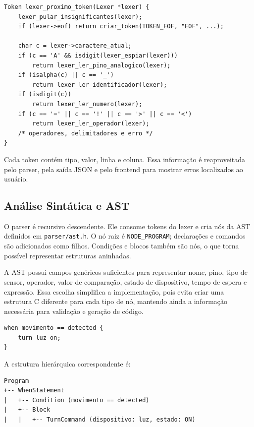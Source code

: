 \documentclass[conference]{IEEEtran}
\begin{document}
\begin{lstlisting}[style=csmall,caption={Fluxo simplificado do lexer.},label={lst:lexer}]
Token lexer_proximo_token(Lexer *lexer) {
    lexer_pular_insignificantes(lexer);
    if (lexer->eof) return criar_token(TOKEN_EOF, "EOF", ...);

    char c = lexer->caractere_atual;
    if (c == 'A' && isdigit(lexer_espiar(lexer)))
        return lexer_ler_pino_analogico(lexer);
    if (isalpha(c) || c == '_')
        return lexer_ler_identificador(lexer);
    if (isdigit(c))
        return lexer_ler_numero(lexer);
    if (c == '=' || c == '!' || c == '>' || c == '<')
        return lexer_ler_operador(lexer);
    /* operadores, delimitadores e erro */
}
\end{lstlisting}

Cada token contém tipo, valor, linha e coluna. Essa informação é reaproveitada pelo parser, pela saída JSON e pelo frontend para mostrar erros localizados ao usuário.

\subsection{Análise Sintática e AST}
O parser é recursivo descendente. Ele consome tokens do lexer e cria nós da AST definidos em \texttt{parser/ast.h}. O nó raiz é \texttt{NODE\_PROGRAM}; declarações e comandos são adicionados como filhos. Condições e blocos também são nós, o que torna possível representar estruturas aninhadas.

A AST possui campos genéricos suficientes para representar nome, pino, tipo de sensor, operador, valor de comparação, estado de dispositivo, tempo de espera e expressão. Essa escolha simplifica a implementação, pois evita criar uma estrutura C diferente para cada tipo de nó, mantendo ainda a informação necessária para validação e geração de código.

\begin{lstlisting}[style=homescript,caption={Entrada usada para exemplo de AST.},label={lst:astinput}]
when movimento == detected {
    turn luz on;
}
\end{lstlisting}

A estrutura hierárquica correspondente é:

\begin{lstlisting}[basicstyle=\ttfamily\scriptsize,frame=single,breaklines=true]
Program
+-- WhenStatement
|   +-- Condition (movimento == detected)
|   +-- Block
|   |   +-- TurnCommand (dispositivo: luz, estado: ON)
\end{lstlisting}
\end{document}
